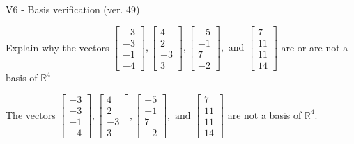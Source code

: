 \begin{exercise}
  \begin{exerciseTitle}V6 - Basis verification (ver. 49)\end{exerciseTitle}
  \begin{exerciseStatement}
    Explain why the vectors \(\left[\begin{array}{r}
-3 \\
-3 \\
-1 \\
-4
\end{array}\right] , \left[\begin{array}{r}
4 \\
2 \\
-3 \\
3
\end{array}\right] , \left[\begin{array}{r}
-5 \\
-1 \\
7 \\
-2
\end{array}\right] , \text{ and } \left[\begin{array}{r}
7 \\
11 \\
11 \\
14
\end{array}\right]\) are or are not a basis of \(\mathbb{R}^4\)	


  \end{exerciseStatement}
  \begin{exerciseAnswer}
   The vectors \(\left[\begin{array}{r}
-3 \\
-3 \\
-1 \\
-4
\end{array}\right] , \left[\begin{array}{r}
4 \\
2 \\
-3 \\
3
\end{array}\right] , \left[\begin{array}{r}
-5 \\
-1 \\
7 \\
-2
\end{array}\right] , \text{ and } \left[\begin{array}{r}
7 \\
11 \\
11 \\
14
\end{array}\right]\) 
  	 are not  a basis of \(\mathbb{R}^4\).
  


  \end{exerciseAnswer}
\end{exercise}